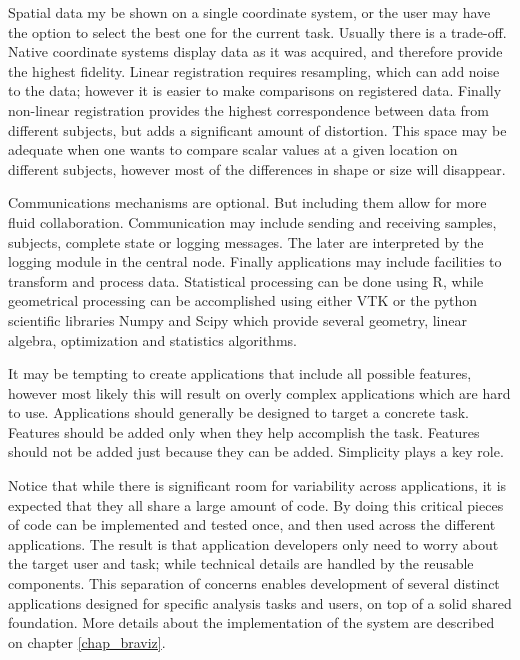 Spatial data my be shown on a single coordinate system, or the user may have the option to select the best one for the current task. Usually there is a trade-off. Native coordinate systems display data as it was acquired, and therefore provide the highest fidelity. Linear registration requires resampling, which can add noise to the data; however it is easier to make comparisons on registered data. Finally non-linear registration provides the highest correspondence between data from different subjects, but adds a significant amount of distortion. This space may be adequate when one wants to compare scalar values at a given location on different subjects, however most of the differences in shape or size will disappear.

Communications mechanisms are optional. But including them allow for more fluid collaboration. Communication may include sending and receiving samples, subjects, complete state or logging messages. The later are interpreted by the logging module in the central node. Finally applications may include facilities to transform and process data. Statistical processing can be done using R, while geometrical processing can be accomplished using either VTK or the python scientific libraries Numpy and Scipy which provide several geometry, linear algebra, optimization and statistics algorithms. 

It may be tempting to create applications that include all possible features, however most likely this will result on overly complex applications which are hard to use. Applications should generally be designed to target a concrete task. Features should be added only when they help accomplish the task. Features should not be added just because they can be added. Simplicity plays a key role. 

Notice that while there is significant room for variability across applications, it is expected that they all share a large amount of code. By doing this critical pieces of code  can be implemented and tested once, and then used across the different applications. The result is that application developers only need to worry about the target user and task; while technical details are handled by the reusable components. This separation of concerns enables development of several distinct applications designed for specific analysis tasks and users, on top of a solid shared foundation. More details about the implementation of the system are described on chapter \ref{chap_braviz}.


%
%
